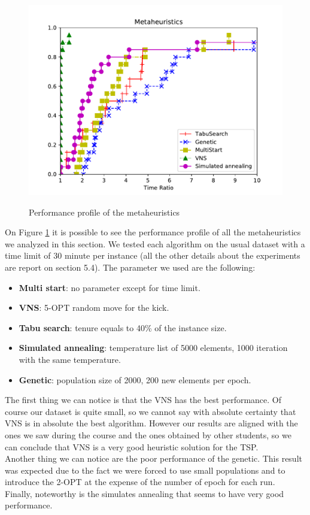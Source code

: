 \begin{figure}[h!]
\centering
	\includegraphics[scale=0.9]{media/metaheuristics.pdf} \\
	\caption{Performance profile of the metaheuristics}
	\label{fig:metaheuristics}
\end{figure}

On Figure \ref{fig:metaheuristics} it is possible to see the performance profile of all the metaheuristics we analyzed in this section. We tested each algorithm on the usual dataset with a time limit of 30 minute per instance (all the other details about the experiments are report on section 5.4). The parameter we used are the following:

\begin{itemize}
	\item \textbf{Multi start}: no parameter except for time limit.
	\item \textbf{VNS}: 5-OPT random move for the kick.
	\item \textbf{Tabu search}: tenure equals to 40\% of the instance size.
	\item \textbf{Simulated annealing}: temperature list of 5000 elements, 1000 iteration with the same temperature.
	\item \textbf{Genetic}: population size of 2000, 200 new elements per epoch. 
\end{itemize}

\noindent The first thing we can notice is that the VNS has the best performance. Of course our dataset is quite small, so we cannot say with absolute certainty that VNS is in absolute the best algorithm. However our results are aligned with the ones we saw during the course and the ones obtained by other students, so we can conclude that VNS is a very good heuristic solution for the TSP. \\
Another thing we can notice are the poor performance of the genetic. This result was expected due to the fact we were forced to use small populations and to introduce the 2-OPT at the expense of the number of epoch for each run. \\
Finally, noteworthy is the simulates annealing that seems to have very good performance.

